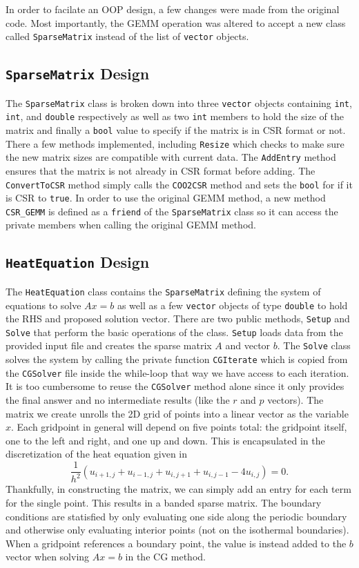 \documentclass[10pt,a4paper]{article}
\begin{document}
In order to facilate an OOP design, a few changes were made from the original code. Most importantly, the GEMM operation was altered to accept a new class called \texttt{SparseMatrix} instead of the list of \texttt{vector} objects.

\subsection*{\texttt{SparseMatrix} Design}
The \texttt{SparseMatrix} class is broken down into three \texttt{vector} objects containing \texttt{int}, \texttt{int}, and \texttt{double} respectively as well as two \texttt{int} members to hold the size of the matrix and finally a \texttt{bool} value to specify if the matrix is in CSR format or not. There a few methods implemented, including \texttt{Resize} which checks to make sure the new matrix sizes are compatible with current data. The \texttt{AddEntry} method ensures that the matrix is not already in CSR format before adding. The \texttt{ConvertToCSR} method simply calls the \texttt{COO2CSR} method and sets the \texttt{bool} for if it is CSR to \texttt{true}. In order to use the original GEMM method, a new method \texttt{CSR\_GEMM} is defined as a \texttt{friend} of the \texttt{SparseMatrix} class so it can access the private members when calling the original GEMM method.

\subsection*{\texttt{HeatEquation} Design}
The \texttt{HeatEquation} class contains the \texttt{SparseMatrix} defining the system of equations to solve $A x = b$ as well as a few \texttt{vector} objects of type \texttt{double} to hold the RHS and proposed solution vector. There are two public methods, \texttt{Setup} and \texttt{Solve} that perform the basic operations of the class. \texttt{Setup} loads data from the provided input file and creates the sparse matrix $A$ and vector $b$. The \texttt{Solve} class solves the system by calling the private function \texttt{CGIterate} which is copied from the \texttt{CGSolver} file inside the while-loop that way we have access to each iteration. It is too cumbersome to reuse the \texttt{CGSolver} method alone since it only provides the final answer and no intermediate results (like the $r$ and $p$ vectors).
\newline
The matrix we create unrolls the 2D grid of points into a linear vector as the variable $x$. Each gridpoint in general will depend on five points total: the gridpoint itself, one to the left and right, and one up and down. This is encapsulated in the discretization of the heat equation given in \cite{Part2}
$$ \frac{1}{h^2} \left(u_{i+1,j} + u_{i-1,j} + u_{i,j+1} + u_{i,j-1} - 4u_{i,j}\right) = 0 .$$
Thankfully, in constructing the matrix, we can simply add an entry for each term for the single point. This results in a banded sparse matrix. The boundary conditions are statisfied by only evaluating one side along the periodic boundary and otherwise only evaluating interior points (not on the isothermal boundaries). When a gridpoint references a boundary point, the value is instead added to the $b$ vector when solving $A x = b$ in the CG method.
\end{document}
